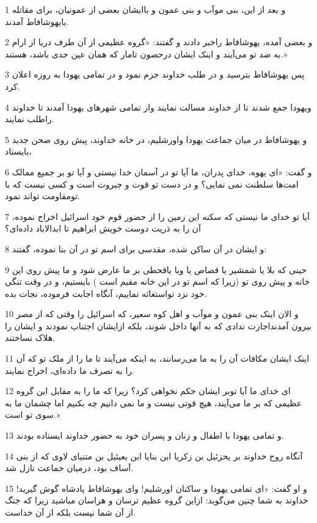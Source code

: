 \par 1 و بعد از این، بنی موآب و بنی عمون و باایشان بعضی از عمونیان، برای مقاتله بایهوشافاط آمدند.
\par 2 و بعضی آمده، یهوشافاط راخبر دادند و گفتند: «گروه عظیمی از آن طرف دریا از ارام به ضد تو می‌آیند و اینک ایشان درحصون تامار که همان عین جدی باشد، هستند.»
\par 3 پس یهوشافاط بترسید و در طلب خداوند جزم نمود و در تمامی یهودا به روزه اعلان کرد.
\par 4 ویهودا جمع شدند تا از خداوند مسالت نمایند واز تمامی شهرهای یهودا آمدند تا خداوند راطلب نمایند.
\par 5 و یهوشافاط در میان جماعت یهودا واورشلیم، در خانه خداوند، پیش روی صحن جدید بایستاد،
\par 6 و گفت: «ای یهوه، خدای پدران، ما آیا تو در آسمان خدا نیستی و آیا تو بر جمیع ممالک امت‌ها سلطنت نمی نمایی؟ و در دست تو قوت و جبروت است و کسی نیست که با تومقاومت تواند نمود.
\par 7 آیا تو خدای ما نیستی که سکنه این زمین را از حضور قوم خود اسرائیل اخراج نموده، آن را به ذریت دوست خویش ابراهیم تا ابدالاباد داده‌ای؟
\par 8 و ایشان در آن ساکن شده، مقدسی برای اسم تو در آن بنا نموده، گفتند:
\par 9 حینی که بلا یا شمشیر یا قصاص یا وبا یاقحطی بر ما عارض شود و ما پیش روی این خانه و پیش روی تو (زیرا که اسم تو در این خانه مقیم است ) بایستیم، و در وقت تنگی خود نزد تواستغاثه نماییم، آنگاه اجابت فرموده، نجات بده.
\par 10 و الان اینک بنی عمون و موآب و اهل کوه سعیر، که اسرائیل را وقتی که از مصر بیرون آمدنداجازت ندادی که به آنها داخل شوند، بلکه ازایشان اجتناب نمودند و ایشان را هلاک نساختند.
\par 11 اینک ایشان مکافات آن را به ما می‌رسانند، به اینکه می‌آیند تا ما را از ملک تو که آن را به تصرف ما داده‌ای، اخراج نمایند.
\par 12 ‌ای خدای ما آیا توبر ایشان حکم نخواهی کرد؟ زیرا که ما را به مقابل این گروه عظیمی که بر ما می‌آیند، هیچ قوتی نیست و ما نمی دانیم چه بکنیم اما چشمان ما به سوی تو است.»
\par 13 و تمامی یهودا با اطفال و زنان و پسران خود به حضور خداوند ایستاده بودند.
\par 14 آنگاه روح خداوند بر یحزئیل بن زکریا ابن بنایا ابن یعیئیل بن متنیای لاوی که از بنی آساف بود، درمیان جماعت نازل شد.
\par 15 و او گفت: «ای تمامی یهودا و ساکنان اورشلیم! و‌ای یهوشافاط پادشاه گوش گیرید! خداوند به شما چنین می‌گوید: ازاین گروه عظیم ترسان و هراسان مباشید زیرا که جنگ از آن شما نیست بلکه از آن خداست.
